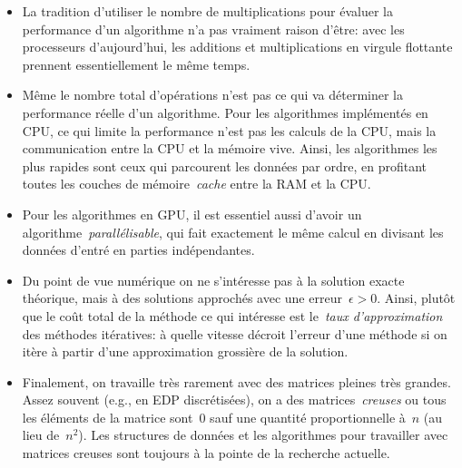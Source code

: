 \begin{itemize}
	\item La tradition d'utiliser le nombre de multiplications pour évaluer la
		performance d'un algorithme n'a pas vraiment raison d'être: avec les
		processeurs d'aujourd'hui, les additions et multiplications en virgule
		flottante prennent essentiellement le même temps.
	\item Même le nombre total d'opérations n'est pas ce qui va déterminer la
		performance réelle d'un algorithme.  Pour les algorithmes implémentés en
		CPU, ce qui limite la performance n'est pas les calculs de la CPU, mais
		la communication entre la CPU et la mémoire vive.  Ainsi, les algorithmes
		les plus rapides sont ceux qui parcourent les données par ordre, en
		profitant toutes les couches de mémoire~\emph{cache} entre la RAM et la
		CPU.
	\item Pour les algorithmes en GPU, il est essentiel aussi d'avoir un
		algorithme~\emph{parallélisable}, qui fait exactement le même calcul en
		divisant les données d'entré en parties indépendantes.
	\item Du point de vue numérique on ne s'intéresse pas à la solution exacte
		théorique, mais à des solutions approchés avec une erreur~$\epsilon>0$.
		Ainsi, plutôt que le coût total de la méthode ce qui intéresse est
		le~\emph{taux d'approximation} des méthodes itératives: à quelle vitesse
		décroit l'erreur d'une méthode si on itère à partir d'une approximation
		grossière de la solution.
	\item Finalement, on travaille très rarement avec des matrices pleines très
		grandes.  Assez souvent (e.g., en EDP discrétisées), on a des
		matrices~\emph{creuses} ou tous les éléments de la matrice
		sont~$0$ sauf une quantité proportionnelle à~$n$ (au lieu de~$n^2$).
		Les structures de données et les algorithmes pour travailler avec
		matrices creuses sont toujours à la pointe de la recherche actuelle.
\end{itemize}



